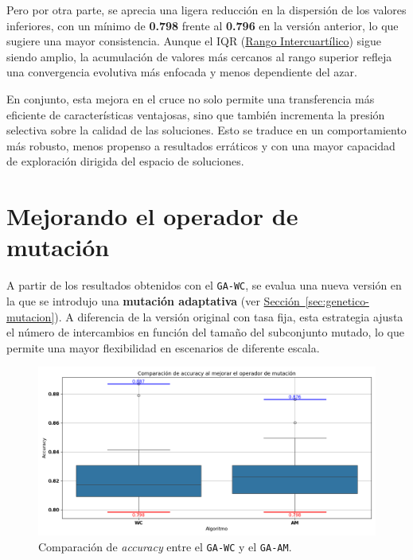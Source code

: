 Pero por otra parte, se aprecia una ligera reducción en la dispersión de los valores inferiores,
con un mínimo de \textbf{0.798} frente al \textbf{0.796} en la versión anterior, lo que sugiere una mayor consistencia.
Aunque el IQR (\hyperref[subsec:visualizacion-de-resultados]{Rango Intercuartílico}) sigue siendo amplio,
la acumulación de valores más cercanos al rango superior refleja una convergencia evolutiva más enfocada y menos dependiente del azar.

En conjunto, esta mejora en el cruce no solo permite una transferencia más eficiente de características ventajosas,
sino que también incrementa la presión selectiva sobre la calidad de las soluciones.
Esto se traduce en un comportamiento más robusto, menos propenso a resultados erráticos y con una mayor capacidad de exploración dirigida del espacio de soluciones.


\section{Mejorando el operador de mutación}\label{sec:mejorando-mutacion}
A partir de los resultados obtenidos con el \texttt{GA-WC}, se evalua una nueva versión en la que se introdujo una \textbf{mutación adaptativa}
(ver \hyperref[sec:genetico-mutacion]{Sección~\ref*{sec:genetico-mutacion}}).
A diferencia de la versión original con tasa fija, esta estrategia ajusta el número de intercambios en función del tamaño del subconjunto mutado,
lo que permite una mayor flexibilidad en escenarios de diferente escala.

\begin{figure}[htp]
    \centering
    \includegraphics[width=1\textwidth]{imagenes/evaluaciones/mutacion-adaptativa.png}
    \caption{Comparación de \textit{accuracy} entre el \texttt{GA-WC} y el \texttt{GA-AM}.}
    \label{fig:mutacion-adaptativa}
\end{figure}

